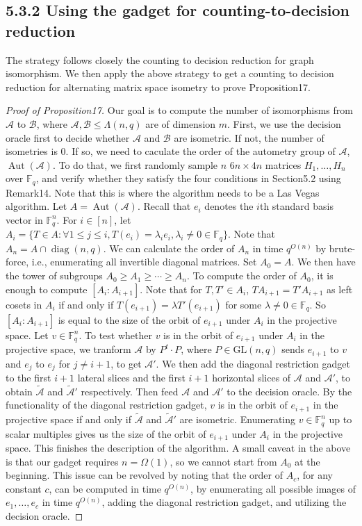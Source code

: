 \subsection*{5.3.2 Using the gadget for counting-to-decision reduction}
The strategy follows closely the counting to decision reduction for graph isomorphism. We then apply the above strategy to get a counting to decision reduction for alternating matrix space isometry to prove Proposition17.
\begin{proof}[Proof of Proposition17]
Our goal is to compute the number of isomorphisms from $\mathcal A$ to $\mathcal B$, where $\mathcal A,\mathcal B\le\Lambda(n,q)$ are of dimension $m$. First, we use the decision oracle first to decide whether $\mathcal A$ and $\mathcal B$ are isometric. If not, the number of isometries is 0. If so, we need to caculate the order of the autometry group of $\mathcal A$, $\operatorname{Aut}(\mathcal A)$. To do that, we first randomly sample $n$ $6n\times4n$ matrices $H_1,\ldots,H_n$ over $\mathbb F_q$, and verify whether they satisfy the four conditions in Section5.2 using Remark14. Note that this is where the algorithm needs to be a Las Vegas algorithm.
Let $A=\operatorname{Aut}(\mathcal A)$. Recall that $e_i$ denotes the $i$th standard basis vector in $\mathbb F_q^n$. For $i\in[n]$, let $A_i=\{T\in A:\forall1\le j\le i,T(e_i)=\lambda_ie_i,\lambda_i\ne0\in\mathbb F_q\}$. Note that $A_n=A\cap\operatorname{diag}(n,q)$. We can calculate the order of $A_n$ in time $q^{O(n)}$ by brute-force, i.e., enumerating all invertible diagonal matrices. Set $A_0=A$. We then have the tower of subgroups $A_0\ge A_1\ge\cdots\ge A_n$.
To compute the order of $A_0$, it is enough to compute $[A_i:A_{i+1}]$. Note that for $T,T'\in A_i$, $TA_{i+1}=T'A_{i+1}$ as left cosets in $A_i$ if and only if $T(e_{i+1})=\lambda T'(e_{i+1})$ for some $\lambda\ne0\in\mathbb F_q$. So $[A_i:A_{i+1}]$ is equal to the size of the orbit of $e_{i+1}$ under $A_i$ in the projective space. Let $v\in\mathbb F_q^n$. To test whether $v$ is in the orbit of $e_{i+1}$ under $A_i$ in the projective space, we tranform $\mathcal A$ by $P^t\cdot P$, where $P\in\mathrm{GL}(n,q)$ sends $e_{i+1}$ to $v$ and $e_j$ to $e_j$ for $j\ne i+1$, to get $\mathcal A'$. We then add the diagonal restriction gadget to the first $i+1$ lateral slices and the first $i+1$ horizontal slices of $\mathcal A$ and $\mathcal A'$, to obtain $\widetilde{\mathcal A}$ and $\widetilde{\mathcal A}'$ respectively. Then feed $\mathcal A$ and $\mathcal A'$ to the decision oracle. By the functionality of the diagonal restriction gadget, $v$ is in the orbit of $e_{i+1}$ in the projective space if and only if $\widetilde{\mathcal A}$ and $\widetilde{\mathcal A}'$ are isometric. Enumerating $v\in\mathbb F_q^n$ up to scalar multiples gives us the size of the orbit of $e_{i+1}$ under $A_i$ in the projective space. This finishes the description of the algorithm.
A small caveat in the above is that our gadget requires $n=\Omega(1)$, so we cannot start from $A_0$ at the beginning. This issue can be revolved by noting that the order of $A_c$, for any constant $c$, can be computed in time $q^{O(n)}$, by enumerating all possible images of $e_1,\ldots,e_c$ in time $q^{O(n)}$, adding the diagonal restriction gadget, and utilizing the decision oracle.
\end{proof}
